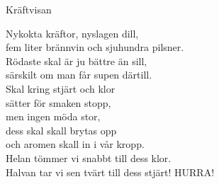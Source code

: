 \begin{song}{Kräftvisan}
	
	
	
	Nykokta kräftor, nyslagen dill,\\
	fem liter brännvin och sjuhundra pilsner.\\
	Rödaste skal är ju bättre än sill,\\
	särskilt om man får supen därtill.\\
	Skal kring stjärt och klor\\
	sätter för smaken stopp,\\
	men ingen möda stor,\\
	dess skal skall brytas opp\\
	och aromen skall in i vår kropp.\\
	Helan tömmer vi snabbt till dess klor.\\
	Halvan tar vi sen tvärt till dess stjärt! HURRA!
	
	
	
\end{song}
